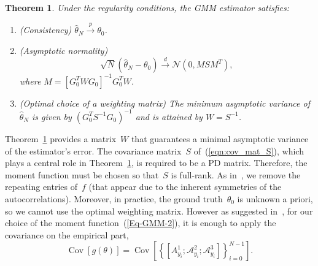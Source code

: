 \documentclass{article}
\newtheorem{theorem}[assumption]{Theorem}%
\newcommand{\A}[0]{\mathcal{A}}
\newcommand{\Cov}[0]{\operatorname{Cov}}
\begin{document}
\begin{theorem}\label{Thm-2-6}
	Under {the} regularity conditions, the GMM estimator satisfies:
	\begin{enumerate}[label={\Alph*}.]
		\item  \label{Thm-2-2}
		\textnormal{(Consistency)} $\hat{\theta}_N \overset{p}{\to} \theta_0$.

		\item \label{Thm-2-3} \textnormal{(Asymptotic normality)}
		\[\sqrt{N} ( \hat{\theta}_N - \theta_0) \overset{d}{\to} \mathcal{N}(0, M S M^T ),\] where $M =[G_0^T W  G_0]^{-1} G_0^T  W$.

		\item \label{Thm-2-5} \textnormal{(Optimal choice of a weighting matrix)} The minimum asymptotic variance of $\hat{\theta}_N$ is given by $(G_0^T S^{-1} G_0)^{-1}$ and is attained by $W = S^{-1}$.
	\end{enumerate}
\end{theorem}
Theorem~\ref{Thm-2-6} provides a matrix~$W$ {that} guarantees a minimal asymptotic variance of the estimator’s error. The covariance matrix~$S$ {of~(\ref{eqn:cov_mat_S}), which plays a central role in Theorem~\ref{Thm-2-6},} is required to be a PD matrix. Therefore, the moment function must be chosen so that~$S$ is full-rank. As in~\cite{abas2021generalized},  we remove the repeating entries of~$f$ (that appear due to the inherent symmetries of the autocorrelations). Moreover, in practice, the ground truth~$\theta_0$ is unknown a priori, so we cannot use the optimal weighting matrix. However as suggested in~\cite{abas2021generalized}, for our choice of the moment function~(\ref{Eq-GMM-2}), it is enough to apply the covariance on the empirical part,
	\begin{equation}\label{Eq-2-7}
		\Cov[g(\theta)] = \Cov\left[\left\{[A_{y_i}^1;\A_{y_i}^2;\A_{y_i}^3]\right\}_{i = 0}^{N - 1}\right].
	\end{equation}
\end{document}
